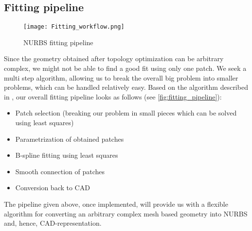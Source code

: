 \subsection{Fitting pipeline}
\begin{figure}
\centering
  \texttt{[image: Fitting\_workflow.png]}
  \caption{NURBS fitting pipeline}
  \label{fig:fitting_pipeline}
\end{figure}
Since the geometry obtained after topology optimization can be arbitrary complex, we might not be able to find a good fit using only one patch. We seek a multi step algorithm, allowing us to break the overall big problem into smaller problems, which can be handled relatively easy.
Based on the algorithm described in \cite{eck1996automatic}, our overall fitting pipeline looks as follows (see \autoref{fig:fitting_pipeline}):
\begin{itemize}
	\item Patch selection (breaking our problem in small pieces which can be solved using least squares)
	\item Parametrization of obtained patches
	\item B-spline fitting using least squares
	\item Smooth connection of patches
	\item Conversion back to CAD
\end{itemize}

The pipeline given above, once implemented, will provide us with a flexible algorithm for converting an arbitrary complex mesh based geometry into NURBS and, hence, CAD-representation.